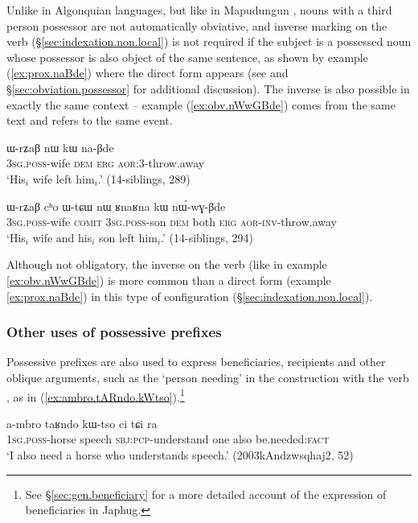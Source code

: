 Unlike in Algonquian languages, but like in Mapudungun \citep{haude16symmetrical}, nouns with a third person possessor are not automatically obviative, and inverse marking on the verb (§\ref{sec:indexation.non.local}) is not required if the subject is a possessed noun whose possessor is also object of the same sentence, as shown by example (\ref{ex:prox.naBde}) where the direct form  appears (see \citealt{jacques10inverse} and §\ref{sec:obviation.possessor} for additional discussion). The inverse  is also possible in exactly the same context -- example  (\ref{ex:obv.nWwGBde}) comes from the same text and refers to the same event. 

\begin{exe}
\ex \label{ex:prox.naBde}
\gll ɯ-rʑaβ nɯ kɯ na-βde \\
\textsc{3sg}.\textsc{poss}-wife \textsc{dem} \textsc{erg} \textsc{aor}:3\flobv{}-throw.away \\
\glt `His$_i$ wife left him$_i$.' (14-siblings, 289)
\end{exe}

\begin{exe}
\ex \label{ex:obv.nWwGBde}
\gll ɯ-rʑaβ cʰo ɯ-tɕɯ nɯ ʁnaʁna kɯ nɯ́-wɣ-βde\\
\textsc{3sg}.\textsc{poss}-wife \textsc{comit} \textsc{3sg}.\textsc{poss}-son \textsc{dem} both \textsc{erg} \textsc{aor}-\textsc{inv}-throw.away\\
\glt `His$_i$ wife and his$_i$ son left him$_i$.' (14-siblings, 294)
\end{exe}

Although not obligatory, the inverse on the verb (like in example \ref{ex:obv.nWwGBde}) is more common than a direct form (example \ref{ex:prox.naBde}) in this type of configuration (§\ref{sec:indexation.non.local}).

\subsubsection{Other uses of possessive prefixes} \label{sec:other.uses.poss.prefixes}
Possessive prefixes are also used to express beneficiaries, recipients and other oblique arguments, such as the `person needing' in the construction with the verb ,  as in (\ref{ex:ambro.tARndo.kWtso}).\footnote{See §\ref{sec:gen.beneficiary} for a more detailed account of the expression of beneficiaries in Japhug.}

 \begin{exe}
\ex \label{ex:ambro.tARndo.kWtso}
\gll a-mbro taʁndo kɯ-tso ci tɕi ra \\
\textsc{1sg}.\textsc{poss}-horse speech \textsc{sbj}:\textsc{pcp}-understand one also be.needed:\textsc{fact} \\
\glt `I also need a horse who understands speech.' (2003kAndzwsqhaj2, 52)
\end{exe}

